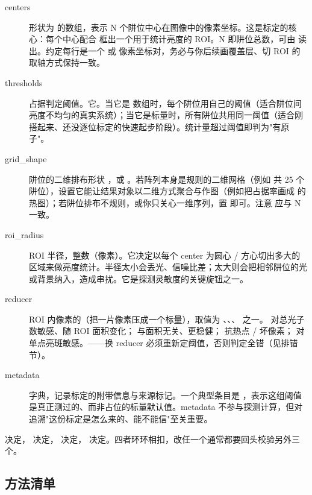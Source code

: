 \documentclass[11pt,oneside,openany]{book}
\begin{document}
\begin{description}
\item[centers] 形状为  的数组，表示 N 个阱位中心在图像中的像素坐标。这是标定的核心：每个中心配合  框出一个用于统计亮度的 ROI。N 即阱位总数，可由  读出。约定每行是一个  或  像素坐标对，务必与你后续画覆盖层、切 ROI 的取轴方式保持一致。
\item[thresholds] 占据判定阈值。它。当它是  数组时，每个阱位用自己的阈值（适合阱位间亮度不均匀的真实系统）；当它是标量时，所有阱位共用同一阈值（适合刚搭起来、还没逐位标定的快速起步阶段）。统计量超过阈值即判为"有原子"。
\item[grid\_shape] 阱位的二维排布形状 ，或 。若阵列本身是规则的二维网格（例如  共 25 个阱位），设置它能让结果对象以二维方式聚合与作图（例如把占据率画成  的热图）；若阱位排布不规则，或你只关心一维序列，置  即可。注意  应与 N 一致。
\item[roi\_radius] ROI 半径，整数（像素）。它决定以每个 center 为圆心 / 方心切出多大的区域来做亮度统计。半径太小会丢光、信噪比差；太大则会把相邻阱位的光或背景纳入，造成串扰。它是探测灵敏度的关键旋钮之一。
\item[reducer] ROI 内像素的（把一片像素压成一个标量），取值为 、、、 之一。 对总光子数敏感、随 ROI 面积变化； 与面积无关、更稳健； 抗热点 / 坏像素； 对单点亮斑敏感。——换 reducer 必须重新定阈值，否则判定全错（见排错节）。
\item[metadata] 字典，记录标定的附带信息与来源标记。一个典型条目是 ，表示这组阈值是真正测过的、而非占位的标量默认值。metadata 不参与探测计算，但对追溯"这份标定是怎么来的、能不能信"至关重要。
\end{description}

\begin{notebox}[一句话记住四个旋钮]
 决定， 决定， 决定， 决定。四者环环相扣，改任一个通常都要回头校验另外三个。
\end{notebox}

\subsection{方法清单}
\end{document}
